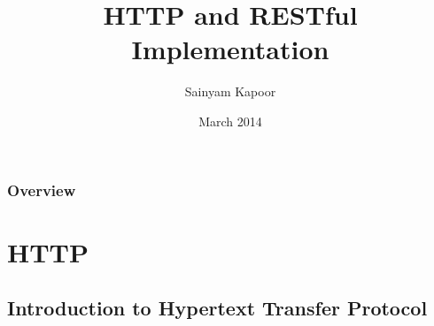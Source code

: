 \documentclass{beamer}
\title[HTTP and REST]{HTTP and RESTful Implementation} %
\author{Sainyam Kapoor} %
\institute[IIT-(BHU)] %
{
Indian Institute of Technology-(BHU),Varanasi \\ %
\medskip
\textit{sainyam.kapoor.cse12@iitbhu.ac.in} %
}
\date{March 2014} %
\begin{document}
\begin{frame}
\titlepage %
\end{frame}

\begin{frame}
\frametitle{Overview} %
\tableofcontents %
\end{frame}


\section{HTTP} %

\subsection{Introduction to Hypertext Transfer Protocol} %
\end{document}
